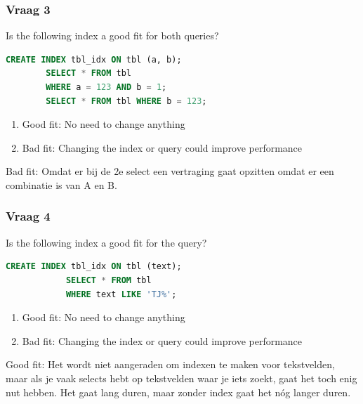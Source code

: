 \documentclass{report}
\begin{document}
        
    \subsubsection{Vraag 3}
        Is the following index a good fit for both queries?
        \begin{lstlisting}[language=SQL]
        CREATE INDEX tbl_idx ON tbl (a, b);
        SELECT * FROM tbl
        WHERE a = 123 AND b = 1;
        SELECT * FROM tbl WHERE b = 123;
        \end{lstlisting}
        \begin{enumerate}
            \item Good fit: No need to change anything
            \item Bad fit: Changing the index or query could improve performance
        \end{enumerate}
        Bad fit: Omdat er bij de 2e select een vertraging gaat opzitten omdat er een combinatie is van A en B.
        
    \subsubsection{Vraag 4}
        Is the following index a good fit for the query?
        \begin{lstlisting}[language=SQL]
            CREATE INDEX tbl_idx ON tbl (text);
            SELECT * FROM tbl
            WHERE text LIKE 'TJ%';
        \end{lstlisting}
        \begin{enumerate}
            \item Good fit: No need to change anything
            \item Bad fit: Changing the index or query could improve performance
        \end{enumerate}
        Good fit: Het wordt niet aangeraden om indexen te maken voor tekstvelden, maar als je vaak selects hebt op tekstvelden waar je iets zoekt, gaat het toch enig nut hebben. Het gaat lang duren, maar zonder index gaat het nóg langer duren.
        
\end{document}
